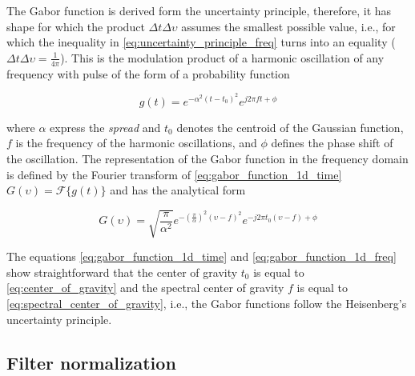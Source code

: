 The Gabor function is derived form the uncertainty principle, therefore, it has shape for which the product $\Delta t \Delta \upsilon$ assumes the smallest possible value, i.e., for which the inequality in \eqref{eq:uncertainty_principle_freq} turns into an equality ($\Delta t \Delta \upsilon = \frac{1}{4 \pi}$). This is the modulation product of a harmonic oscillation of any frequency with pulse of the form of a probability function \cite{Gabor:JIEE:1946a}

\begin{equation}\label{eq:gabor_function_1d_time}
    g(t) =  e ^{-\alpha^2(t-t_0)^2} e ^{j 2 \pi f t + \phi}
\end{equation}

where $\alpha$ express the \textit{spread} and $t_0$ denotes the centroid of the Gaussian function, $f$ is the frequency of the harmonic oscillations, and $\phi$ defines the phase shift of the oscillation. The representation of the Gabor function in the frequency domain is defined by the Fourier transform of \eqref{eq:gabor_function_1d_time} $G(\upsilon) = \mathcal{F}\{g(t)\}$ and has the analytical form

\begin{equation}\label{eq:gabor_function_1d_freq}
    G(\upsilon) =  \sqrt{\frac{\pi}{\alpha^2}} e ^{-\left(\frac{\pi}{\alpha}\right) ^{2} (\upsilon-f)^2} e ^{-j 2 \pi t_0 (\upsilon-f) + \phi}
\end{equation}

The equations \eqref{eq:gabor_function_1d_time} and \eqref{eq:gabor_function_1d_freq} show straightforward that the center of gravity $t_0$ is equal to \eqref{eq:center_of_gravity} and the spectral center of gravity $f$ is equal to \eqref{eq:spectral_center_of_gravity}, i.e., the Gabor functions follow the Heisenberg's uncertainty principle.  



\subsection{Filter normalization}

